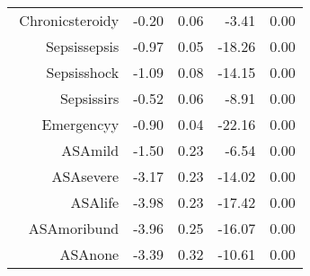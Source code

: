 \begin{tabular}{rrrrr}
$$  Chronic\-steroid\-y & -0.20 & 0.06 & -3.41 & 0.00 \\ 
  Sepsis\-sepsis & -0.97 & 0.05 & -18.26 & 0.00 \\ 
  Sepsis\-shock & -1.09 & 0.08 & -14.15 & 0.00 \\ 
  Sepsis\-sirs & -0.52 & 0.06 & -8.91 & 0.00 \\ 
  Emergency\-y & -0.90 & 0.04 & -22.16 & 0.00 \\ 
  ASA\-mild & -1.50 & 0.23 & -6.54 & 0.00 \\ 
  ASA\-severe & -3.17 & 0.23 & -14.02 & 0.00 \\ 
  ASA\-life & -3.98 & 0.23 & -17.42 & 0.00 \\ 
  ASA\-moribund & -3.96 & 0.25 & -16.07 & 0.00 \\ 
  ASA\-none & -3.39 & 0.32 & -10.61 & 0.00 \\ 
   \hline
\end{tabular}

